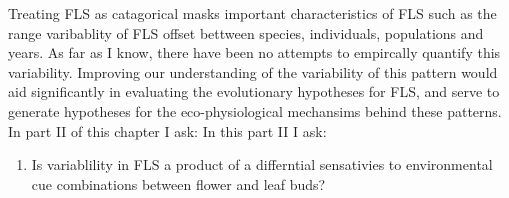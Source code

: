 \documentclass{article}\usepackage[]{graphicx}\usepackage[]{color}
\begin{document}
{\begin{enumerate}
\end{enumerate}
\indet Treating FLS as catagorical masks important characteristics of FLS such as the range varibablity of FLS offset bettween species, individuals, populations and years. As far as I know, there have been no attempts to empircally quantify this variability. Improving our understanding of the variability of this pattern would aid significantly in evaluating the evolutionary hypotheses for FLS, and serve to generate hypotheses for the eco-physiological mechansims behind these patterns. In part II of this chapter I ask:
 In this part II I ask:
\begin{enumerate}
\item Is variablility in FLS a product of a differntial sensativies to environmental cue combinations between flower and leaf buds?
\end{enumerate}

}
\end{document}
